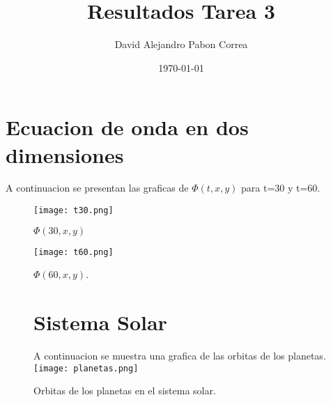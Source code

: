 \documentclass[letterpaper,12pt]{article}
\begin{document}
\title{Resultados Tarea 3}
\author{David Alejandro Pabon Correa}
\date{\today}
\maketitle

\section{Ecuacion de onda en dos dimensiones}

A continuacion se presentan las graficas de $\Phi(t,x,y)$ para t=30 y t=60.
\begin{figure}[ht] 
	\texttt{[image: t30.png]}

		 \caption{
        	        \label{fig:exp_plots}  
            	    $\Phi(30,x,y)$
        }
\end{figure}


\begin{figure}[ht] 

	\texttt{[image: t60.png]}

		 \caption{
        	        \label{fig:exp_plots}  
            	     $\Phi(60,x,y)$.
        }
\end{figure}



\begin{figure}[ht] 

\section{Sistema Solar}
A continuacion se muestra una grafica de las orbitas de los planetas. 
	\texttt{[image: planetas.png]}

		 \caption{
        	        \label{fig:exp_plots}  
            	    Orbitas de los planetas en el sistema solar.
        }
\end{figure}
\end{document}
